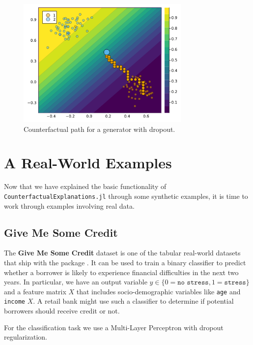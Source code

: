 \documentclass[
  letterpaper,
  DIV=11,
  numbers=noendperiod]{scrartcl}
\begin{document}
\begin{figure}

{\centering \includegraphics[width=3.33333in,height=2.5in]{www/dropout.png}

}

\caption{\label{fig-dropout}Counterfactual path for a generator with
dropout.}

\end{figure}

\hypertarget{sec-emp}{%
\section{A Real-World Examples}\label{sec-emp}}

Now that we have explained the basic functionality of
\texttt{CounterfactualExplanations.jl} through some synthetic examples,
it is time to work through examples involving real data.

\hypertarget{give-me-some-credit}{%
\subsection{Give Me Some Credit}\label{give-me-some-credit}}

The \textbf{Give Me Some Credit} dataset is one of the tabular
real-world datasets that ship with the package \cite{kaggle2011give}. It
can be used to train a binary classifier to predict whether a borrower
is likely to experience financial difficulties in the next two years. In
particular, we have an output variable
\(y \in \{0=\texttt{no stress},1=\texttt{stress}\}\) and a feature
matrix \(X\) that includes socio-demographic variables like \texttt{age}
and \texttt{income} \(X\). A retail bank might use such a classifier to
determine if potential borrowers should receive credit or not.

For the classification task we use a Multi-Layer Perceptron with dropout
regularization.
\end{document}
